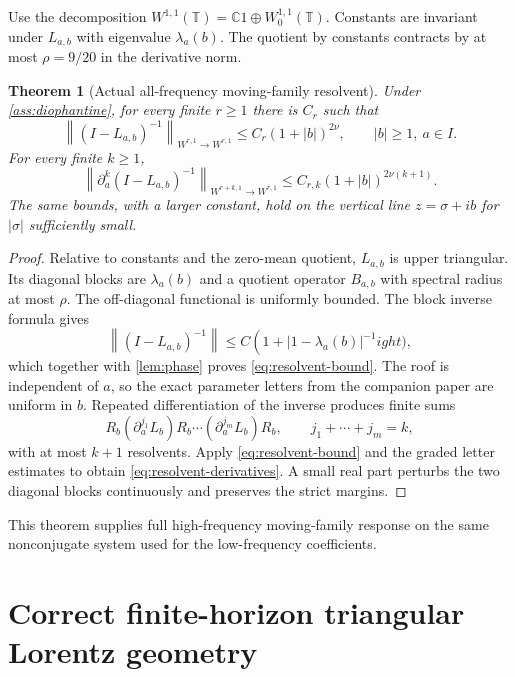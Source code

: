 \documentclass[11pt,reqno]{amsart}
\newtheorem{theorem}{Theorem}[section]
\theoremstyle{definition}
\theoremstyle{remark}
\newcommand{\C}{\mathbb C}
\newcommand{\T}{\mathbb T}
\newcommand{\norm}[1]{\left\lVert #1\right\rVert}
\newcommand{\abs}[1]{\left\lvert #1\right\rvert}
\begin{document}
Use the decomposition $W^{1,1}(\T)=\C1\oplus W^{1,1}_0(\T)$.  Constants are
invariant under $L_{a,b}$ with eigenvalue $\lambda_a(b)$.  The quotient by
constants contracts by at most $\rho=9/20$ in the derivative norm.

\begin{theorem}[Actual all-frequency moving-family resolvent]\label{thm:highfreq}
Under \cref{ass:diophantine}, for every finite $r\ge1$ there is $C_r$ such
that
\begin{equation}\label{eq:resolvent-bound}
 \norm{(I-L_{a,b})^{-1}}_{W^{r,1}\to W^{r,1}}
 \le C_r(1+\abs b)^{2\nu},
 \qquad \abs b\ge1,\ a\in I.
\end{equation}
For every finite $k\ge1$,
\begin{equation}\label{eq:resolvent-derivatives}
 \norm{\partial_a^k(I-L_{a,b})^{-1}}_{W^{r+k,1}\to W^{r,1}}
 \le C_{r,k}(1+\abs b)^{2\nu(k+1)}.
\end{equation}
The same bounds, with a larger constant, hold on the vertical line
$z=\sigma+ib$ for $\abs\sigma$ sufficiently small.
\end{theorem}

\begin{proof}
Relative to constants and the zero-mean quotient, $L_{a,b}$ is upper
triangular.  Its diagonal blocks are $\lambda_a(b)$ and a quotient operator
$B_{a,b}$ with spectral radius at most $\rho$.  The off-diagonal functional is
uniformly bounded.  The block inverse formula gives
\[
 \norm{(I-L_{a,b})^{-1}}
 \le C\left(1+\abs{1-\lambda_a(b)}^{-1}
ight),
\]
which together with \cref{lem:phase} proves \eqref{eq:resolvent-bound}.
The roof is independent of $a$, so the exact parameter letters from the
companion paper are uniform in $b$.  Repeated differentiation of the inverse
produces finite sums
\[
 R_b(\partial_a^{j_1}L_b)R_b\cdots
 (\partial_a^{j_m}L_b)R_b,
 \qquad j_1+\cdots+j_m=k,
\]
with at most $k+1$ resolvents.  Apply \eqref{eq:resolvent-bound} and the graded
letter estimates to obtain \eqref{eq:resolvent-derivatives}.  A small real part
perturbs the two diagonal blocks continuously and preserves the strict
margins.
\end{proof}

This theorem supplies full high-frequency moving-family response on the same
nonconjugate system used for the low-frequency coefficients.

\section{Correct finite-horizon triangular Lorentz geometry}\label{sec:triangle}
\end{document}
